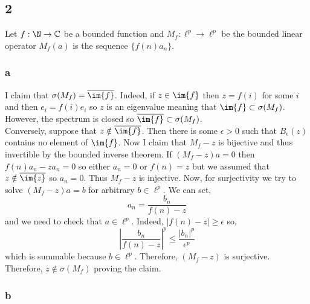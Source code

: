 \documentclass[12pt]{article}
\renewcommand{\C}{\mathbb{C}}
\begin{document}
\subsection{2}

Let $f : \N \to \C$ be a bounded function and $M_f : \ell^p \to \ell^p$ be the bounded linear operator $M_f(a)$ is the sequence $\{ f(n) a_n \}$.

\subsubsection{a}

I claim that $\sigma(M_f) = \overline{\im{f}}$. Indeed, if $z \in \im{f}$ then $z = f(i)$ for some $i$ and then $e_i = f(i) e_i$ so $z$ is an eigenvalue meaning that $\im{f} \subset \sigma(M_f)$. However, the spectrum is closed so $\overline{\im{f}} \subset \sigma(M_f)$.
\bigskip\\
Conversely, suppose that $z \notin \overline{\im{f}}$. Then there is some $\epsilon > 0$ such that $B_\epsilon(z)$ contains no element of $\im{f}$. Now I claim that $M_f - z$ is bijective and thus invertible by the bounded inverse theorem. If $(M_f - z) a = 0$ then $f(n) a_n - z a_n = 0$ so either $a_n = 0$ or $f(n) = z$ but we assumed that $z \notin \overline{\im{z}}$ so $a_n = 0$. Thus $M_f - z$ is injective. Now, for surjectivity we try to solve $(M_f - z) a = b$ for arbitrary $b \in \ell^p$. We can set,
\[ a_n = \frac{b_n}{f(n) - z} \]
and we need to check that $a \in \ell^p$. Indeed, $|f(n) - z| \ge \epsilon$ so,
\[ \left| \frac{b_n}{f(n) - z} \right|^p \le \frac{|b_n|^p}{\epsilon^p} \]
which is summable because $b \in \ell^p$. Therefore, $(M_f - z)$ is surjective. Therefore, $z \notin \sigma(M_f)$ proving the claim. 

\subsubsection{b}
\end{document}
